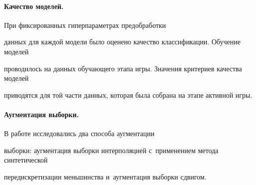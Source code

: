 \paragraph*{Качество моделей.} При фиксированных гиперпараметрах предобработки 

данных для каждой модели было оценено качество классификации. Обучение моделей 

проводилось на данных обучающего этапа игры. Значения критериев качества моделей 

приводятся для той части данных, которая была собрана на этапе активной игры.





\paragraph*{Аугментация выборки.} В работе исследовались два способа аугментации 

выборки: аугментация выборки интерполяцией с~применением метода синтетической 

передискретизации меньшинства и~аугментация выборки сдвигом.



